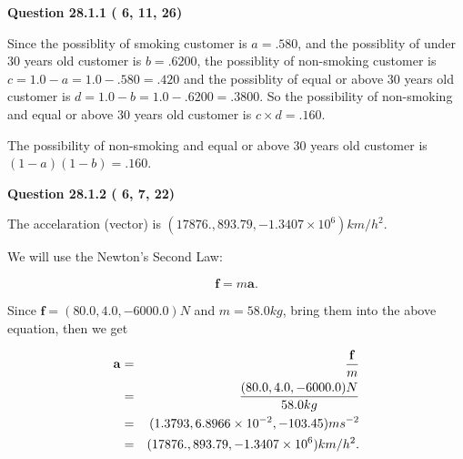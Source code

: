 \documentclass[12pt]{article}
\begin{document}
\vspace{0.2in}
  
{\textbf{\Large{Question
28.1.1 
 (          6,         11,         26)
}}}
  
  
 
 
\noindent{}

Since the possiblity of  %
smoking customer is $ a =  %
.580 $,
and the possiblity of  %
 under 30 years old customer is $ b =  %
.6200 $,
the possiblity of  %
non-smoking customer is $ c = 1.0 - a = 1.0 -
.580
=  %
.420 $ and the possiblity of  %
equal or above 30 years old
customer is $ d = 1.0 - b = 1.0 -  %
.6200 =  %
.3800  $.
So the possibility of  %
 non-smoking and  %
equal or above 30 years old
customer is $ c \times d =  %
.160 $.
 
 
 
 
 
\noindent{}

The possibility of  %
 non-smoking and  %
equal or above 30 years old
customer is $ (1-a)(1-b) =  %
.160 $.
 
 
  
\vspace{0.2in}
  
{\textbf{\Large{Question
28.1.2 
 (          6,          7,         22)
}}}
  
  
 
 
\noindent{}
 
 
The accelaration (vector) is
$(
17876.,
893.79 ,
-1.3407 \times 10^{6}
)km/h^2.
$
 
 
 
 
 
 
\noindent{}

We will use the Newton's Second Law:
 
\[
\mathbf{f}=m\mathbf{a}.
\]
 
Since $\mathbf{f}=( %
80.0,  %
4.0,  %
-6000.0 )N$
and $m= %
58.0 kg$, bring them into the above equation, then we get
 
\begin{eqnarray*}
\mathbf{a}&=&\frac{\mathbf{f}}m  \\
&=&\frac{(
80.0 ,
4.0 ,
-6000.0 )N
}{ %
58.0 kg}  \\
&=&(
1.3793 ,
6.8966 \times 10^{-2},
-103.45
)ms^{-2} \\
&=&(
17876. ,
893.79 ,
-1.3407 \times 10^{6}
)km/h^2.
\end{eqnarray*}
 
\end{document}
